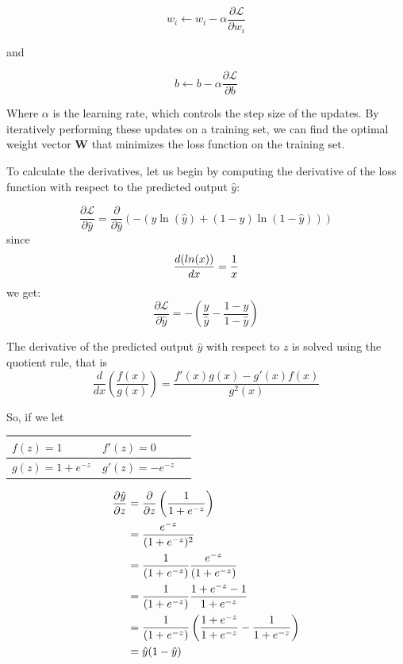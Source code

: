 		
		\begin{equation}
			w_i \leftarrow w_i - \alpha \frac{\partial \mathcal{L}}{\partial w_i}
		\end{equation}
		
		and
		
		\begin{equation}
			b \leftarrow b - \alpha \frac{\partial \mathcal{L}}{\partial b}
		\end{equation}
		
		
		Where $\alpha$ is the learning rate, which controls the step size of the updates. By iteratively performing these updates on a training set, we can find the optimal weight vector $\textbf{W}$ that minimizes the loss function on the training set.
		
		\bigskip
		
		To calculate the derivatives, let us begin by computing the derivative of the loss function with respect to the predicted output $\hat{y}$:
		
		
		$$
		\frac{\partial \mathcal{L}}{\partial\hat{y}} = 
		\frac{\partial}{\partial\hat{y}} 
		\left(  
		-\left(y\ln(\hat{y}) + (1-y)\ln(1-\hat{y})\right)
		\right) 
		$$
		since 
		$$\frac{d \space (ln (x))}{dx}  = \frac{1}{x}$$we get:
		$$\frac{\partial \mathcal{L}}{\partial \hat{y}} = - \left( \frac{y}{\hat{y}} - \frac{1-y}{1-\hat{y}} \right) $$
		
		The derivative of the predicted output $\hat{y}$ with respect to $z$ is solved using the quotient rule, that is 
		$$
		\frac{d}{dx} \left( \frac{f(x)}{g(x)} \right) = \frac{f'(x)g(x) - g'(x)f(x)}{g^2(x)}
		$$
		
		So, if we let
		
		\begin{table}[!ht]
			\centering
			\begin{tabular}{|l|l|l|}
				\hline
				$f(z) = 1$ & $f'(z) = 0$ \\ \hline
				$g(z)=1 +e^{-z}$ & $g'(z)= -e^{-z}$ \\ \hline
			\end{tabular}
		\end{table}
		
		
		\begin{align*}
			\frac{\partial\hat{y}}{\partial z} 
			& = \frac{\partial}{\partial z} \left( \frac{1}{1 + e^{-z}} \right) \\
			& = \frac{e^{-z}}{(1 + e^{-z})^2} \\
			& = \frac{1}{(1 + e^{-z})} \space \frac{e^{-z}}{(1 + e^{-z})} \\
			& = \frac{1}{(1 + e^{-z})} \space \frac{1 + e^{-z} -1}{1 + e^{-z}} \\
			& = \frac{1}{(1 + e^{-z})} \space \left( \frac{1 + e^{-z}}{1 + e^{-z}} - \frac{1}{1 + e^{-z}} \right)\\
			& = \hat{y}(1-\hat{y})\\
		\end{align*}
		
